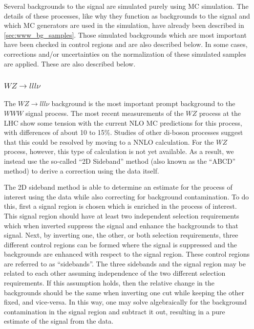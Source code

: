 

Several backgrounds to the signal are simulated purely using MC simulation.
The details of these processes, like why they function as backgrounds
to the signal and which MC generators are used in the simulation,
have already been described in \sec\ref{sec:www_bg_samples}.
Those simulated backgrounds
which are most important have been checked in control regions and are 
also described below.
In some cases, corrections and/or uncertainties on 
the normalization of these simulated samples are applied. 
These are also described below.

%



\subsubsection{$WZ\rightarrow lll\nu$}
\label{sec:wzbg}

The $WZ\rightarrow lll \nu$ background is the most important prompt background 
to the $WWW$ signal process. 
The most recent measurements of the $WZ$ process at the LHC
\cite{Aad:2012twa,Anger:1663539,CMS-PAS-SMP-12-006} 
show some tension with the current NLO MC predictions for this process, 
with differences of about 10 to 15\%. 
Studies of other di-boson processes 
\cite{Grazzini:2015nwa,Cascioli:2014yka}
suggest that this could be resolved by 
moving to a NNLO calculation.
For the $WZ$ process, however, this type of calculation is not yet available.
As a result, we instead use the so-called ``2D Sideband'' method (also known as the 
``ABCD'' method) \cite{Aad:2013izg} to derive a correction using the data itself.

The 2D sideband method is able to determine an estimate
for the process of interest using the data while also correcting
for background contamination. 
To do this, first a signal region 
is chosen which is enriched in the process of interest.
This signal region should have at least two 
independent selection requirements which when inverted suppress
the signal and enhance the backgrounds to that signal.
Next, by inverting one, the other, or both selection requirements, 
three different control regions can be formed
where the signal is suppressed and the backgrounds are enhanced 
with respect to the signal region. 
These control regions are referred to as ``sidebands''.
The three sidebands and the signal region may be
related to each other assuming independence of the two different selection
requirements. If this assumption holds, then the relative change in the 
backgrounds should be the same
when inverting one cut while keeping the other fixed, and vice-versa.
In this way, one may solve algebraically for the background contamination 
in the signal region and subtract it out, resulting in a pure
estimate of the signal from the data. 


